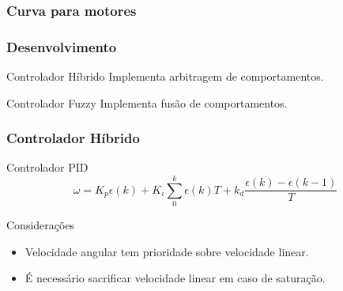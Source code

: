 \begin{frame}
	\frametitle{Curva para motores}
	
\end{frame}

\begin{frame}
	
\end{frame}

\begin{frame}
	
\end{frame}
	
\begin{frame}
	\frametitle{Desenvolvimento}
	\begin{block}{Controlador Híbrido}
		Implementa arbitragem de comportamentos.
	\end{block}
	
	\begin{exampleblock}{Controlador Fuzzy}
		Implementa fusão de comportamentos.
	\end{exampleblock}
\end{frame}

\begin{frame}
	\frametitle{Controlador Híbrido}
	\begin{exampleblock}{Controlador PID}
		\begin{equation}
			\omega = K_p \epsilon(k) + K_i \sum_0^k \epsilon(k) T + k_d \frac{\epsilon(k) - \epsilon(k-1)}{T}
		\end{equation}
	\end{exampleblock}
	
	\begin{block}{Considerações}
		\begin{itemize}
		  \item Velocidade angular tem prioridade sobre velocidade linear.
		  \item É necessário sacrificar velocidade linear em caso de saturação.
		\end{itemize}
	\end{block}
\end{frame}
	
